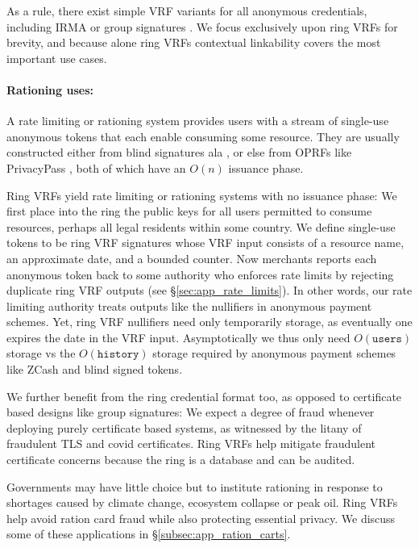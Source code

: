 As a rule, there exist simple VRF variants for all anonymous credentials,
including IRMA \cite{IRMAcredentials} or group signatures \cite{group_sig_survey}.
We focus exclusively upon ring VRFs for brevity, and because alone
ring VRFs contextual linkability covers the most important use cases.

\paragraph{Rationing uses:}

A rate limiting or rationing system provides users with a stream
of single-use anonymous tokens that each enable consuming some resource.
They are usually constructed either
from blind signatures ala \cite{chaum83}, or else
from OPRFs like PrivacyPass \cite{PrivacyPass},
both of which have an $O(n)$ issuance phase.

Ring VRFs yield rate limiting or rationing systems with no issuance phase:
We first place into the ring the public keys for all users permitted to
consume resources, perhaps all legal residents within some country.  
We define single-use tokens to be ring VRF signatures whose VRF input
consists of a resource name, an approximate date, and a bounded counter.
Now merchants reports each anonymous token back to some authority who
enforces rate limits by rejecting duplicate ring VRF outputs
(see \S\ref{sec:app_rate_limits}).
In other words, our rate limiting authority treats outputs like the
nullifiers in anonymous payment schemes.
Yet, ring VRF nullifiers need only temporarily storage, as eventually one
expires the date in the VRF input.  Asymptotically we thus only need
$O(\mathtt{users})$ storage vs the $O(\mathtt{history})$ storage
required by anonymous payment schemes like ZCash and blind signed tokens.

We further benefit from the ring credential format too,
as opposed to certificate based designs like group signatures:
We expect a degree of fraud whenever deploying purely certificate
based systems, as witnessed by the litany of fraudulent TLS and covid
certificates.  Ring VRFs help mitigate fraudulent certificate concerns
because the ring is a database and can be audited.

Governments may have little choice but to institute
rationing in response to shortages caused by climate change, ecosystem
collapse or peak oil.  Ring VRFs help avoid ration card fraud
while also protecting essential privacy. We discuss some of these 
applications in \S\ref{subsec:app_ration_carts}.
%

